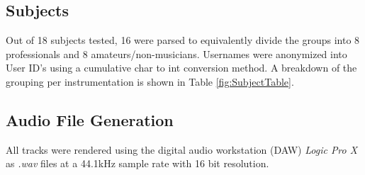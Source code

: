 \subsection{Subjects}
Out of 18 subjects tested, 16 were parsed to equivalently divide the groups into 8 professionals and 8 amateurs/non-musicians. Usernames were anonymized into User ID's using a cumulative char to int conversion method. A breakdown of the grouping per instrumentation is shown in Table \ref{fig:SubjectTable}.
\begin{table}[t]
    \centering
    \caption{Subject Grouping}
    \label{fig:SubjectTable}
\end{table}

\subsection{Audio File Generation}
All tracks were rendered using the digital audio workstation (DAW) \textit{Logic Pro X} as \textit{.wav} files at a 44.1kHz sample rate with 16 bit resolution.

